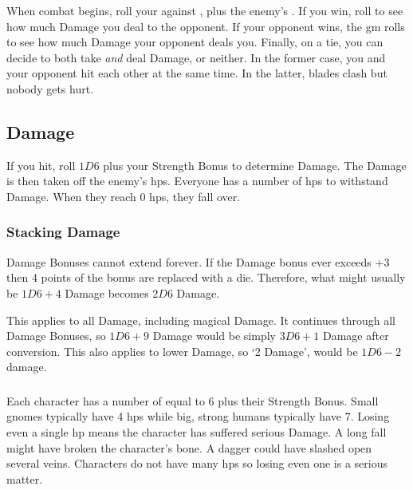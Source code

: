 \begin{multicols}{2}
When combat begins, roll your  against \tn[7], plus the enemy's .
If you win, roll to see how much Damage you deal to the opponent.
If your opponent wins, the \gls{gm} rolls to see how much Damage your opponent deals you.
Finally, on a tie, you can decide to both take \emph{and} deal Damage, or neither.
In the former case, you and your opponent hit each other at the same time.
In the latter, blades clash but nobody gets hurt.

\begin{figure*}[t!]
  \stackingDamageChart
\end{figure*}

\subsection{Damage}

If you hit, roll $1D6$ plus your Strength Bonus to determine Damage.
The Damage is then taken off the enemy's \glspl{hp}.
Everyone has a number of \glspl{hp} to withstand Damage.
When they reach 0 \glspl{hp}, they fall over.

\subsubsection{Stacking Damage}
\label{stackingDamage}

Damage Bonuses cannot extend forever.
If the Damage bonus ever exceeds +3 then 4 points of the bonus are replaced with a die.
Therefore, what might usually be $1D6+4$ Damage becomes $2D6$ Damage.

This applies to all Damage, including magical Damage.
It continues through all Damage Bonuses, so $1D6+9$ Damage would be simply $3D6+1$ Damage after conversion.
This also applies to lower Damage, so `2 Damage', would be $1D6-2$ damage.

\subsubsection{}

Each character has a number of  equal to 6 plus their Strength Bonus.
Small gnomes typically have 4 \glspl{hp} while big, strong humans typically have 7.
Losing even a single \gls{hp} means the character has suffered serious Damage.
A long fall might have broken the character's bone.
A dagger could have slashed open several veins.
Characters do not have many \glspl{hp} so losing even one is a serious matter.


\end{multicols}
